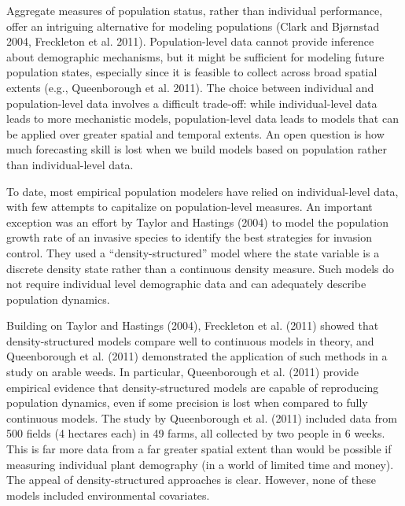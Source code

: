 \documentclass[12pt,]{article}
\begin{document}
Aggregate measures of population status, rather than individual
performance, offer an intriguing alternative for modeling populations
(Clark and Bjørnstad 2004, Freckleton et al. 2011). Population-level
data cannot provide inference about demographic mechanisms, but it might
be sufficient for modeling future population states, especially since it
is feasible to collect across broad spatial extents (e.g., Queenborough
et al. 2011). The choice between individual and population-level data
involves a difficult trade-off: while individual-level data leads to
more mechanistic models, population-level data leads to models that can
be applied over greater spatial and temporal extents. An open question
is how much forecasting skill is lost when we build models based on
population rather than individual-level data.

To date, most empirical population modelers have relied on
individual-level data, with few attempts to capitalize on
population-level measures. An important exception was an effort by
Taylor and Hastings (2004) to model the population growth rate of an
invasive species to identify the best strategies for invasion control.
They used a ``density-structured'' model where the state variable is a
discrete density state rather than a continuous density measure. Such
models do not require individual level demographic data and can
adequately describe population dynamics.

Building on Taylor and Hastings (2004), Freckleton et al. (2011) showed
that density-structured models compare well to continuous models in
theory, and Queenborough et al. (2011) demonstrated the application of
such methods in a study on arable weeds. In particular, Queenborough et
al. (2011) provide empirical evidence that density-structured models are
capable of reproducing population dynamics, even if some precision is
lost when compared to fully continuous models. The study by Queenborough
et al. (2011) included data from 500 fields (4 hectares each) in 49
farms, all collected by two people in 6 weeks. This is far more data
from a far greater spatial extent than would be possible if measuring
individual plant demography (in a world of limited time and money). The
appeal of density-structured approaches is clear. However, none of these
models included environmental covariates.
\end{document}
